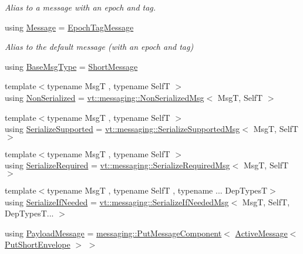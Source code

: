 \begin{DoxyCompactItemize}
\begin{DoxyCompactList}\small\item\em Alias to a message with an epoch and tag. \end{DoxyCompactList}\item 
using \hyperlink{namespacevt_a3a3ddfef40b4c90915fa43cdd5f129ea}{Message} = \hyperlink{namespacevt_a4ccc13b06bff8a4a35426a1a082a95a9}{Epoch\+Tag\+Message}
\begin{DoxyCompactList}\small\item\em Alias to the default message (with an epoch and tag) \end{DoxyCompactList}\item 
using \hyperlink{namespacevt_a44d0d4e144748f2b19a1cfd962f50338}{Base\+Msg\+Type} = \hyperlink{namespacevt_a1125ac1da6c0bbf141e0ea0739d7602d}{Short\+Message}
\item 
{\footnotesize template$<$typename MsgT , typename SelfT $>$ }\\using \hyperlink{namespacevt_a378e4a02213923b4ba1c3f9d2a1424c7}{Non\+Serialized} = \hyperlink{structvt_1_1messaging_1_1_non_serialized_msg}{vt\+::messaging\+::\+Non\+Serialized\+Msg}$<$ MsgT, SelfT $>$
\item 
{\footnotesize template$<$typename MsgT , typename SelfT $>$ }\\using \hyperlink{namespacevt_a3862b8e3f67ab03f3a4313d828592fa9}{Serialize\+Supported} = \hyperlink{structvt_1_1messaging_1_1_serialize_supported_msg}{vt\+::messaging\+::\+Serialize\+Supported\+Msg}$<$ MsgT, SelfT $>$
\item 
{\footnotesize template$<$typename MsgT , typename SelfT $>$ }\\using \hyperlink{namespacevt_a9e60e2e8929828639383ac1d6643384d}{Serialize\+Required} = \hyperlink{structvt_1_1messaging_1_1_serialize_required_msg}{vt\+::messaging\+::\+Serialize\+Required\+Msg}$<$ MsgT, SelfT $>$
\item 
{\footnotesize template$<$typename MsgT , typename SelfT , typename ... Dep\+TypesT$>$ }\\using \hyperlink{namespacevt_a0a4ad8c256fcffa564e9fa7800e4b495}{Serialize\+If\+Needed} = \hyperlink{structvt_1_1messaging_1_1_serialize_if_needed_msg}{vt\+::messaging\+::\+Serialize\+If\+Needed\+Msg}$<$ MsgT, SelfT, Dep\+Types\+T... $>$
\item 
using \hyperlink{namespacevt_a89a92229c5622b855c02c549f83a1a68}{Payload\+Message} = \hyperlink{structvt_1_1messaging_1_1_put_message_component}{messaging\+::\+Put\+Message\+Component}$<$ \hyperlink{namespacevt_a00eb67bd138395b6a4f744fab3fa0678}{Active\+Message}$<$ \hyperlink{namespacevt_a4e561211bbf1d8d9a4766eb159852736}{Put\+Short\+Envelope} $>$ $>$

\end{DoxyCompactItemize}

